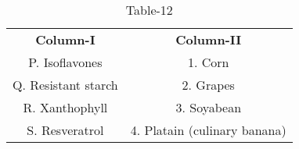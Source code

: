 \begin{table}[htbp]
  \centering
  \caption{Table-12}
  \label{table12}
  \begin{tabular}{cc}
\textbf{Column-I} & \textbf{Column-II}\\

P. Isoflavones & 1. Corn \\
Q. Resistant starch & 2. Grapes \\
R. Xanthophyll & 3. Soyabean \\
S. Resveratrol & 4. Platain (culinary banana) \\
  
  
  
  \end{tabular}
\end{table}